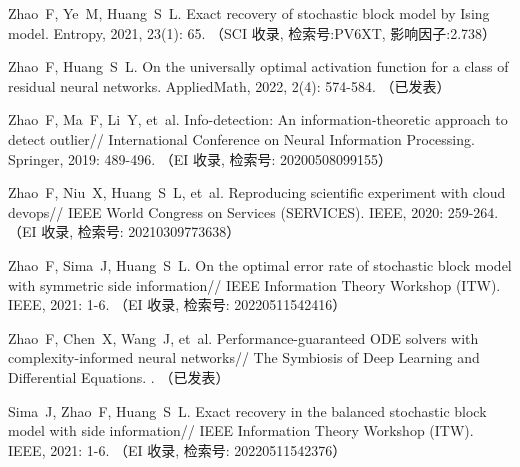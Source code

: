 \begin{resume}
  \begin{achievements}
    \item Zhao~F, Ye~M, Huang~S~L.
    \newblock Exact recovery of stochastic block model by Ising
      model\allowbreak[J].
    \newblock Entropy, 2021{}, 23\allowbreak (1): 65.
    （SCI 收录, 检索号:PV6XT, 影响因子:2.738）
    \item Zhao~F, Huang~S~L.
    \newblock On the universally optimal activation function for a class of
      residual neural networks\allowbreak[J].
      \newblock AppliedMath, 2022, 2\allowbreak (4): 574-584.
      （已发表）
      \item Zhao~F, Ma~F, Li~Y, et~al.
    \newblock Info-detection: An information-theoretic approach to detect
      outlier\allowbreak[C]//\allowbreak
    International Conference on Neural Information Processing.
    \newblock Springer, 2019: 489-496.
    （EI 收录, 检索号: 20200508099155）
    \item Zhao~F, Niu~X, Huang~S~L, et~al.
    \newblock Reproducing scientific experiment with cloud
      devops\allowbreak[C]// IEEE World Congress on Services (SERVICES).
    \newblock IEEE, 2020: 259-264.
    （EI 收录, 检索号: 20210309773638）
    \item Zhao~F, Sima~J, Huang~S~L.
    \newblock On the optimal error rate of stochastic block model with symmetric
      side information\allowbreak[C]// IEEE Information Theory Workshop (ITW).
    \newblock IEEE, 2021{}: 1-6.
    （EI 收录, 检索号: 20220511542416）
    \item Zhao~F, Chen~X, Wang~J, et~al.
    \newblock Performance-guaranteed ODE solvers with complexity-informed neural
      networks\allowbreak[C]//\allowbreak
    The Symbiosis of Deep Learning and Differential Equations.
    .
    （已发表）
    \item Sima~J, Zhao~F, Huang~S~L.
    \newblock Exact recovery in the balanced stochastic block model with side
      information\allowbreak[C]// IEEE Information Theory Workshop (ITW).
    \newblock IEEE, 2021: 1-6.
    （EI 收录, 检索号: 20220511542376）
  \end{achievements}




\end{resume}

